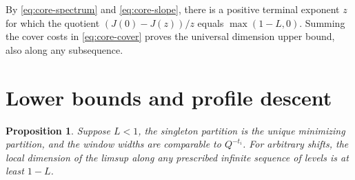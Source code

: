 \documentclass[11pt,reqno,a4paper]{amsart}
\newtheorem{proposition}[theorem]{Proposition}
\theoremstyle{remark}
\numberwithin{equation}{section}
\begin{document}
By \eqref{eq:core-spectrum} and \eqref{eq:core-slope}, there is
a positive terminal exponent $z$ for which the quotient
$(J(0)-J(z))/z$ equals $\max(1-L,0)$. Summing the cover costs
in \eqref{eq:core-cover} proves the universal dimension upper
bound, also along any subsequence.


\section{Lower bounds and profile descent}\label{sec:profile-descent}

\begin{proposition}\label{prop:singleton-lower}
Suppose $L<1$, the singleton partition is the unique minimizing
partition, and the window widths are comparable to $Q^{-t_i}$.
For arbitrary shifts, the local dimension of the limsup along
any prescribed infinite sequence of levels is at least $1-L$.
\end{proposition}
\end{document}
